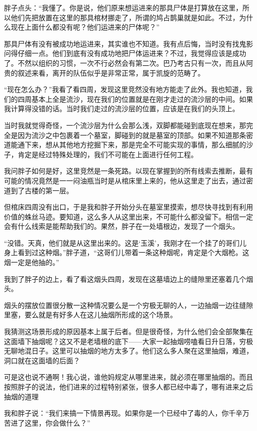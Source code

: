 胖子点头：“我懂了。你是说，他们原来想运进来的那具尸体是打算放在这里，所以他们先把放置在这里的那具棺材挪走了，所谓的鸠占鹊巢就是如此。不过，为什么现在上面什么都没有呢？他们运进来的尸体呢？”

那具尸体有没有被成功地运进来，其实谁也不知道。我有点后悔，当时没有找鬼影问得仔细一点。他们到底有没有成功地把尸体运进来？不过，我觉得应该是成功了。不然以组织的习惯，一次不行必然会有第二次。巴乃考古只有一次，而且从阿贵的叙述来看，离开的队伍似乎是非常正常，属于凯旋的范畴了。

“现在怎么办？”我看了看四周，发现这里竞然没有地方能走了此外。我也知道，我们的四周基本上全是流沙，现在我们的位置就是在刚才走过的流沙层的中间。如果我计算得没错的话。当时我们走过的流沙层的位置，应该是在我们的头顶上。

当时我就觉得奇怪，一个流沙层为什么会那么浅，双脚都能碰到底现在想来，那完全是因为流沙之中包裹着一个墓室，脚碰到的就是墓室的顶部。如果不知道那条密道能通下来，想从其他地方挖掘下来，那是完全不可能实现的事情，那么细腻的沙子，肯定是经过特殊处理的，我们不可能在上面进行任何工程。

我问胖子如何是好，这里竞然是一条死路。以现在掌握到的所有线索去推断，最有可能的情况竟然是一一闷油瓶当时是从棺床里上来的，他从这里走了出去，通过密道到了古楼的第一层。

但棺床四周没有出口，于是我和胖子开始分头在墓室里摸索，想尽快寻找到有利用价值的蛛丝马迹。要知道，这么多人从这里出来，不可能什么都没留下。相信一定会有什么线索是能帮助我们的。果然，胖子在一处墙根边，发现了一个烟头。

“没错。天真，他们就是从这里出来的。这是‘玉溪’，我刚才在一个挂了的哥们儿身上看到过这种烟。”胖子道，“这哥们儿带着一条这种烟呢，肯定是个大烟枪。这烟一定是他抽的。”

我到了胖子的边上，看了看这烟头四周，发现在这墓墙边上的缝隙里还塞着几个烟头。

烟头的摆放位置很分散一这种情况要么是一个穷极无聊的人，一边抽烟一边往缝隙里塞，要么就是有好多人在这儿抽烟所形成的这个场景。

我猜测这场景形成的原因基本上属于后者。但是很奇怪，为什么他们会全部聚集在这面墙下抽烟呢？这又不是老墙根的底下——大家一起抽烟唠嗑看日升日落，穷极无聊地混日子。这里可以抽烟的地方太多了。他们这么多人聚在这里抽烟，难道，洞口就在这面墙的后面？

可是这也说不通啊！我心说，谁他妈规定从哪里进来，就必须在哪里抽烟的。而且按照胖子的说法，他们进来的过程特别紧张，很多人都已经中毒了，哪有进来之后抽烟的道理

我和胖子说：“我们来搞一下情景再现。如果你是一个已经中了毒的人，你千辛万苦进了这里，你会做什么？”

